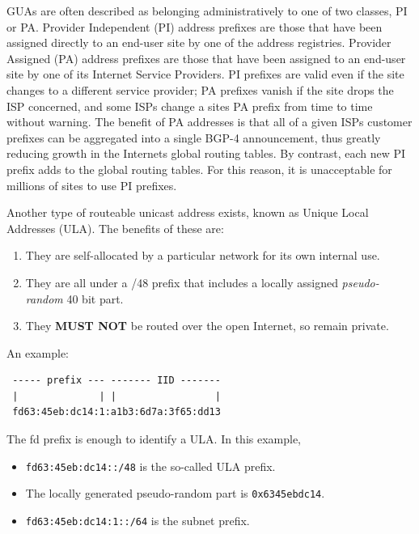 \documentclass[
]{article}
\providecommand{\tightlist}{%
  \setlength{\itemsep}{0pt}\setlength{\parskip}{0pt}}
\begin{document}
GUAs are often described as belonging administratively to one of two
classes, PI or PA. Provider Independent (PI) address prefixes are those
that have been assigned directly to an end-user site by one of the
address registries. Provider Assigned (PA) address prefixes are those
that have been assigned to an end-user site by one of its Internet
Service Providers. PI prefixes are valid even if the site changes to a
different service provider; PA prefixes vanish if the site drops the ISP
concerned, and some ISPs change a site\textquotesingle s PA prefix from
time to time without warning. The benefit of PA addresses is that all of
a given ISP\textquotesingle s customer prefixes can be aggregated into a
single BGP-4 announcement, thus greatly reducing growth in the
Internet\textquotesingle s global routing tables. By contrast, each new
PI prefix adds to the global routing tables. For this reason, it is
unacceptable for millions of sites to use PI prefixes.

Another type of routeable unicast address exists, known as Unique Local
Addresses (ULA). The benefits of these are:

\begin{enumerate}
\def\labelenumi{\arabic{enumi}.}
\tightlist
\item
  They are self-allocated by a particular network for its own internal
  use.
\item
  They are all under a /48 prefix that includes a locally assigned
  \emph{pseudo-random} 40 bit part.
\item
  They \textbf{MUST NOT} be routed over the open Internet, so remain
  private.
\end{enumerate}

An example:

\begin{verbatim}
 ----- prefix --- ------- IID -------
 |              | |                 |
 fd63:45eb:dc14:1:a1b3:6d7a:3f65:dd13
\end{verbatim}

The \textquotesingle fd\textquotesingle{} prefix is enough to identify a
ULA. In this example,

\begin{itemize}
\tightlist
\item
  \texttt{fd63:45eb:dc14::/48} is the so-called ULA prefix.
\item
  The locally generated pseudo-random part is \texttt{0x6345ebdc14}.
\item
  \texttt{fd63:45eb:dc14:1::/64} is the subnet prefix.
\end{itemize}
\end{document}
